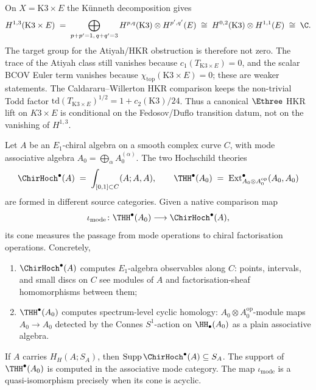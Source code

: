 \begin{corollary}
\label{cor:atiyah-vanishes-K3xE}
On $X=\mathrm K3\times E$ the K\"unneth decomposition gives
\begin{equation}
\label{eq:H13-K3xE-nonvanishing}
 H^{1,3}(\mathrm K3\times E)\;=\;
 \bigoplus_{p+p'=1,\,q+q'=3}H^{p,q}(\mathrm K3)\otimes H^{p',q'}(E)
 \;\cong\; H^{0,2}(\mathrm K3)\otimes H^{1,1}(E)\;\cong\;\C.
\end{equation}
The target group for the Atiyah/HKR obstruction is therefore not zero.
The trace of the Atiyah class still vanishes because
$c_1(T_{\mathrm K3\times E})=0$, and the scalar BCOV Euler term
vanishes because $\chi_{\mathrm{top}}(\mathrm K3\times E)=0$; these are
weaker statements.  The Caldararu--Willerton HKR comparison keeps the
non-trivial Todd factor
$\mathrm{td}(T_{\mathrm K3\times E})^{1/2}=1+c_2(\mathrm K3)/24$.
Thus a canonical $\Ethree$ HKR lift on $K3\times E$ is conditional on
the Fedosov/Duflo transition datum, not on the vanishing of
$H^{1,3}$.
\end{corollary}

\begin{proposition}
\label{prop:chirhoch-vs-thh-d3-structural}
Let $A$ be an $E_1$-chiral algebra on a smooth complex curve $C$, with
mode associative algebra $A_0=\bigoplus_\alpha A^{(\alpha)}_0$. The two
Hochschild theories
\[
 \ChirHoch^\bullet(A)\;=\;\int_{[0,1]\subset C}(A;A,A),\qquad
 \THH^\bullet(A_0)\;=\;\mathrm{Ext}^\bullet_{A_0\otimes A_0^{\mathrm{op}}}(A_0,A_0)
\]
are formed in different source categories.  Given a native comparison
map
\[
 \iota_{\mathrm{mode}}\colon
 \THH^\bullet(A_0)\longrightarrow\ChirHoch^\bullet(A),
\]
its cone measures the passage from mode operations to chiral
factorisation operations.  Concretely,
\begin{enumerate}[label=(\roman*),leftmargin=1.5em]
 \item $\ChirHoch^\bullet(A)$ computes $E_1$-algebra observables along
 $C$: points, intervals, and small discs on $C$ see modules of $A$ and
 factorisation-sheaf homomorphisms between them;
 \item $\THH^\bullet(A_0)$ computes spectrum-level cyclic homology:
 $A_0\otimes A_0^{\mathrm{op}}$-module maps $A_0\to A_0$ detected by
 the Connes $S^1$-action on $\HH_\bullet(A_0)$ as a plain associative
 algebra.
\end{enumerate}
If $A$ carries $H_H(A;S_A)$, then
$\operatorname{Supp}\ChirHoch^\bullet(A)\subseteq S_A$.  The support
of $\THH^\bullet(A_0)$ is computed in the associative mode category.
The map $\iota_{\mathrm{mode}}$ is a quasi-isomorphism precisely when
its cone is acyclic.
\end{proposition}

